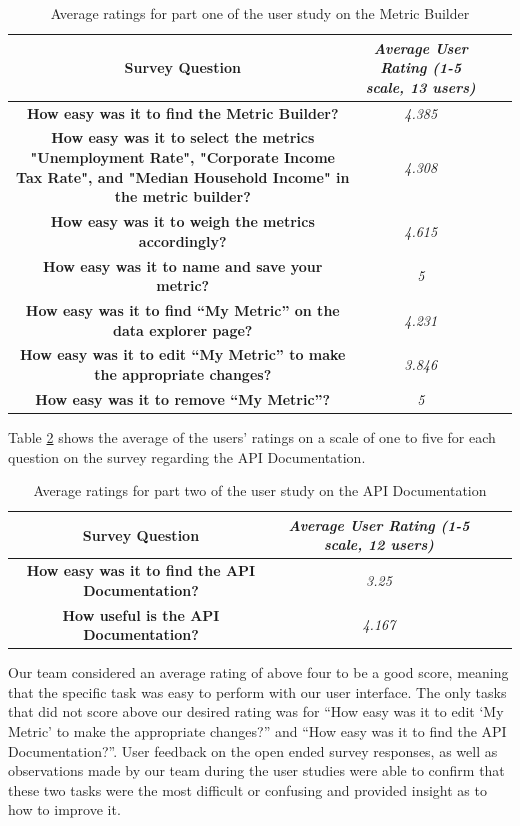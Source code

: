 		\begin{table}[t!]
			\centering
			\begin{tabular}{| >{\bf}c | >{\em}c | l | c |} 
				\hline
				Survey Question 	                        & Average User Rating (1-5 scale, 13 users)																		\\ \hline
				How easy was it to find the Metric Builder?	& 4.385																											\\
				How easy was it to select the metrics "Unemployment Rate", "Corporate Income Tax Rate", and "Median Household Income" in the metric builder?	& 4.308 	\\
				How easy was it to weigh the metrics accordingly? & 4.615																									\\
				How easy was it to name and save your metric? & 5 																											\\
				How easy was it to find “My Metric” on the data explorer page? & 4.231																						\\
				How easy was it to edit “My Metric” to make the appropriate changes? & 3.846																				\\
				How easy was it to remove “My Metric”?	& 5																													\\
				\hline
			\end{tabular}
			\caption{Average ratings for part one of the user study on the Metric Builder}
			\label{metrictest}
		\end{table}
	
	Table \ref{apitest} shows the average of the users' ratings on a scale of one to five for each question on the survey regarding the API Documentation.
	
	\begin{table}[t!]
		\centering
		\begin{tabular}{| >{\bf}c | >{\em}c | l | c |} 
			\hline
			Survey Question 	                        & Average User Rating (1-5 scale, 12 users)	\\ \hline
			How easy was it to find the API Documentation?	& 3.25									\\
			How useful is the API Documentation?	& 4.167										 	\\
			\hline
		\end{tabular}
		\caption{Average ratings for part two of the user study on the API Documentation}
		\label{apitest}
	\end{table}
	
	Our team considered an average rating of above four to be a good score, meaning that the specific task was easy to perform with our user interface.
	The only tasks that did not score above our desired rating was for “How easy was it to edit ‘My Metric’ to make the appropriate changes?” and “How easy was it to find the API Documentation?”. User feedback on the open ended survey responses, as well as observations made by our team during the user studies were able to confirm that these two tasks were the most difficult or confusing and provided insight as to how to improve it.
	 

